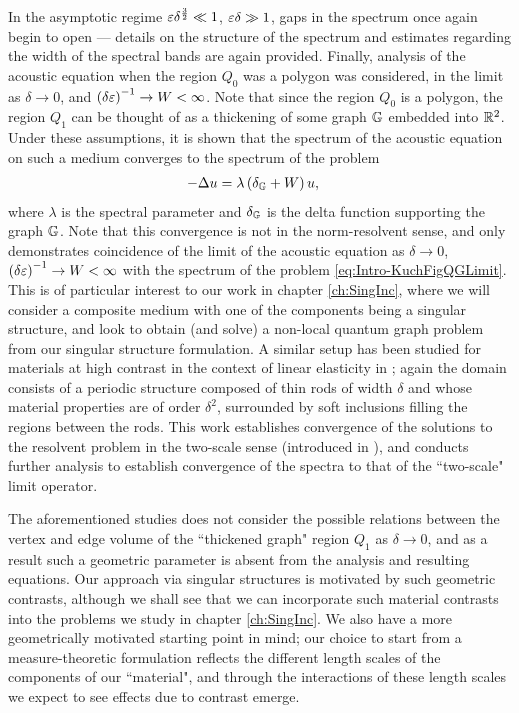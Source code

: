 In the asymptotic regime $\varepsilon\delta^{\frac{3}{2}}\ll 1$, $\varepsilon\delta\gg1$, gaps in the spectrum once again begin to open --- details on the structure of the spectrum and estimates regarding the width of the spectral bands are again provided.
Finally, analysis of the acoustic equation when the region $Q_0$ was a polygon \cite{figotin1998spectral} was considered, in the limit as $\delta\rightarrow0$, and $\left( \delta\varepsilon \right)^{-1}\rightarrow W<\infty$.
Note that since the region $Q_0$ is a polygon, the region $Q_1$ can be thought of as a thickening of some graph $\mathbb{G}$ embedded into $\mathbb{R}^2$.
Under these assumptions, it is shown that the spectrum of the acoustic equation on such a medium converges to the spectrum of the problem
\begin{align} \label{eq:Intro-KuchFigQGLimit}
	-\Delta u &= \lambda\left( \delta_{\mathbb{G}} + W \right)u,
\end{align}
where $\lambda$ is the spectral parameter and $\delta_{\mathbb{G}}$ is the delta function supporting the graph $\mathbb{G}$.
Note that this convergence is not in the norm-resolvent sense, and only demonstrates coincidence of the limit of the acoustic equation as $\delta\rightarrow0$, $\left( \delta\varepsilon \right)^{-1}\rightarrow W<\infty$ with the spectrum of the problem \eqref{eq:Intro-KuchFigQGLimit}.
This is of particular interest to our work in chapter \ref{ch:SingInc}, where we will consider a composite medium with one of the components being a singular structure, and look to obtain (and solve) a non-local quantum graph problem from our singular structure formulation.
A similar setup has been studied for materials at high contrast in the context of linear elasticity in \cite{cherednichenko2019homogenisation}; again the domain consists of a periodic structure composed of thin rods of width $\delta$ and whose material properties are of order $\delta^2$, surrounded by soft inclusions filling the regions between the rods.
This work establishes convergence of the solutions to the resolvent problem in the two-scale sense (introduced in \cite{zhikov2000extension}), and conducts further analysis to establish convergence of the spectra to that of the ``two-scale" limit operator.

The aforementioned studies does not consider the possible relations between the vertex and edge volume of the ``thickened graph" region $Q_1$ as $\delta\rightarrow0$, and as a result such a geometric parameter is absent from the analysis and resulting equations.
Our approach via singular structures is motivated by such geometric contrasts, although we shall see that we can incorporate such material contrasts into the problems we study in chapter \ref{ch:SingInc}.
We also have a more geometrically motivated starting point in mind; our choice to start from a measure-theoretic formulation reflects the different length scales of the components of our ``material", and through the interactions of these length scales we expect to see effects due to contrast emerge.